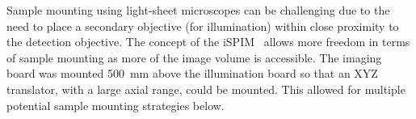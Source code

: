 Sample mounting using light-sheet microscopes can be challenging due to the need to place a secondary objective (for illumination) within close proximity to the detection objective.
The concept of the \gls{iSPIM}~\cite{Wu2011} allows more freedom in terms of sample mounting as more of the image volume is accessible.
The \gls{imaging board} was mounted \SI{500}{\milli\meter} above the \gls{illumination board} so that an XYZ translator, with a large axial range, could be mounted.
This allowed for multiple potential sample mounting strategies below.




